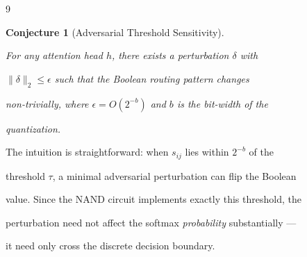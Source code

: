 \documentclass[11pt]{article}
\newtheorem{conjecture}[theorem]{Conjecture}
\theoremstyle{definition}
\begin{document}
\begin{thebibliography}{9}
\begin{conjecture}[Adversarial Threshold Sensitivity]






\label{conj:threshold-sensitivity}






For any attention head $h$, there exists a perturbation $\delta$ with






$\|\delta\|_2 \leq \epsilon$ such that the Boolean routing pattern changes






non-trivially, where $\epsilon = O(2^{-b})$ and $b$ is the bit-width of the






quantization.






\end{conjecture}













The intuition is straightforward: when $s_{ij}$ lies within $2^{-b}$ of the






threshold $\tau$, a minimal adversarial perturbation can flip the Boolean






value.  Since the NAND circuit implements exactly this threshold, the






perturbation need not affect the softmax \emph{probability} substantially ---






it need only cross the discrete decision boundary.














\end{thebibliography}
\end{document}
